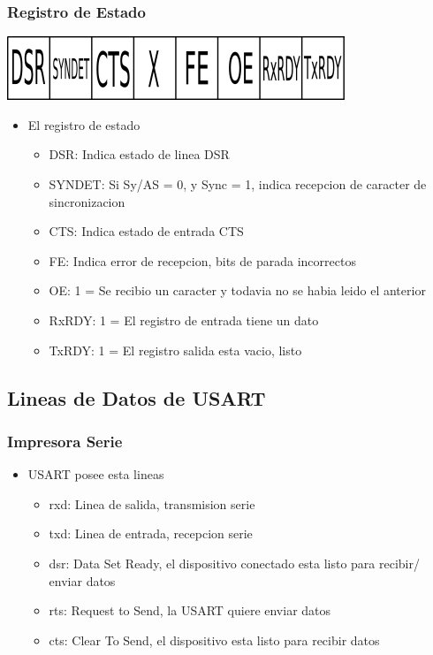 \documentclass{beamer}
\begin{document}
\begin{frame}
\frametitle{Registro de Estado}
\begin{center}
 \includegraphics[scale=0.50]{usart-estado.png}
\end{center}
\begin{itemize}
 \item El registro de estado 
 \begin{itemize}
   \item DSR: Indica estado de linea DSR
   \item SYNDET: Si Sy/AS = 0, y Sync = 1, indica recepcion de caracter de sincronizacion
   \item CTS: Indica estado de entrada CTS
   \item FE: Indica error de recepcion, bits de parada incorrectos
   \item OE: 1 = Se recibio un caracter y todavia no se habia leido el anterior 
   \item RxRDY: 1 = El registro de entrada tiene un dato
   \item TxRDY: 1 = El registro salida esta vacio, listo
   \end{itemize}
\end{itemize}
\end{frame}

\subsection{Lineas de Datos de USART}
\begin{frame}[fragile]
\frametitle{Impresora Serie}
\begin{itemize}
 \item USART posee esta lineas
 \begin{itemize}
  \item rxd: Linea de salida, transmision serie 
  \item txd: Linea de entrada, recepcion serie
  \item dsr: Data Set Ready, el dispositivo conectado esta listo para recibir/ enviar datos
  \item rts: Request to Send, la USART quiere enviar datos
  \item cts: Clear To Send, el dispositivo esta listo para recibir datos
 \end{itemize}
\end{itemize}
\end{frame}
\end{document}
